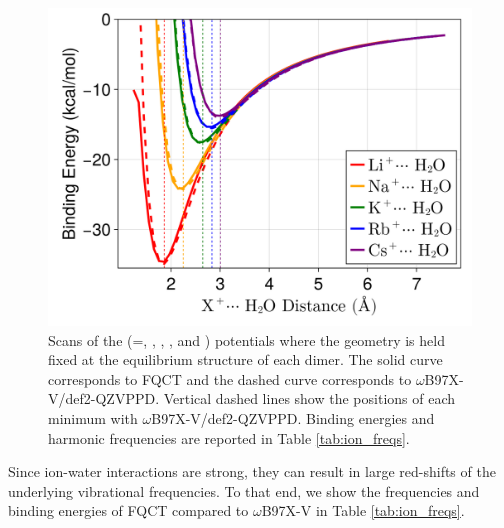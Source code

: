 \documentclass[journal=jacsat,manuscript=article]{achemso}
\begin{document}
\begin{figure}[h]
  \includegraphics*[width=\textwidth]{figures/cation_dimer_scans.png}
  \caption{Scans of the  (=, , , , and )
  potentials where the geometry is held fixed at the equilibrium structure of each dimer.
  The solid curve corresponds to FQCT and the dashed curve corresponds to $\omega$B97X-V/def2-QZVPPD.
  Vertical dashed lines show the positions of each minimum with $\omega$B97X-V/def2-QZVPPD.
  Binding energies and harmonic frequencies are reported in Table \ref{tab:ion_freqs}.
  }\label{fig:alkali_scans}
\end{figure}
Since ion-water interactions are strong, they can result in large red-shifts of the underlying vibrational frequencies. To that end, we show the frequencies and binding energies of FQCT compared to $\omega$B97X-V in Table \ref{tab:ion_freqs}.
\end{document}
